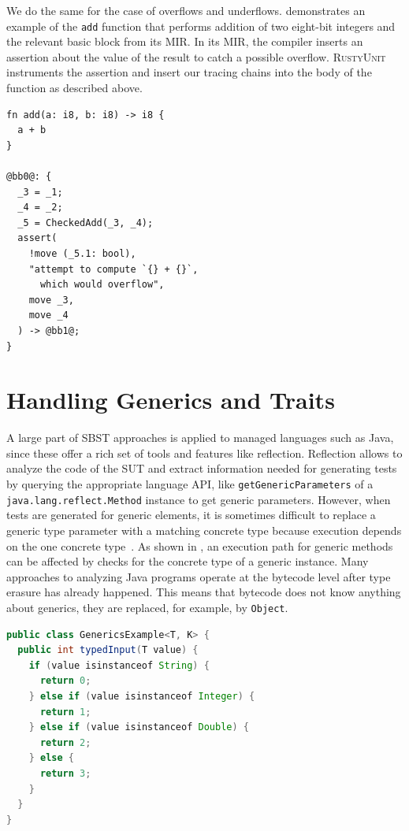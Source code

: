 \documentclass[paper=a4,%
  twoside,%
  BCOR4mm,%
  abstract=true,%
  toc=bibliography,%
  chapterprefix=true,%
  toc=bibliographynumbered,%
  open=right,%
  english,%
  pagesize=pdftex]{scrreprt}
\newcommand{\tech}{\textsc{RustyUnit}\xspace}
\newcommand{\mir}{\ac{MIR}\xspace}
\newcommand{\sut}{\ac{SUT}\xspace}
\begin{document}
We do the same for the case of overflows and underflows.  demonstrates an example of the \texttt{add} function that performs addition of two eight-bit integers and the relevant basic block from its \mir. In its \mir, the compiler inserts an assertion about the value of the result to catch a possible overflow. \tech instruments the assertion and insert our tracing chains into the body of the function as described above.
\begin{lstlisting}[language={MIR}, style=boxed, caption={\mir overflow check created by the compiler}, label=lst:mir-overflow-check]
fn add(a: i8, b: i8) -> i8 {
  a + b
}

@bb0@: {
  _3 = _1;
  _4 = _2;
  _5 = CheckedAdd(_3, _4);
  assert(
    !move (_5.1: bool),
    "attempt to compute `{} + {}`,
      which would overflow",
    move _3,
    move _4
  ) -> @bb1@;
}
\end{lstlisting}

\section{Handling Generics and Traits}
A large part of \ac{SBST} approaches is applied to managed languages such as Java, since these offer a rich set of tools and features like reflection. Reflection allows to analyze the code of the \sut and extract information needed for generating tests by querying the appropriate language \ac{API}, like \texttt{getGenericParameters} of a \texttt{java.lang.reflect.Method} instance to get generic parameters. However, when tests are generated for generic elements, it is sometimes difficult to replace a generic type parameter with a matching concrete type because execution depends on the one concrete type~\cite{Fraser2014b}. As shown in , an execution path for generic methods can be affected by checks for the concrete type of a generic instance. Many approaches to analyzing Java programs operate at the bytecode level after type erasure has already happened. This means that bytecode does not know anything about generics, they are replaced, for example, by \texttt{Object}.

\begin{lstlisting}[language=Java, style=boxed, caption={The execution path of the generic Java method depends on the concrete type of the argument}, label=lst:java-isinstanceof]
public class GenericsExample<T, K> {
  public int typedInput(T value) {
    if (value isinstanceof String) {
      return 0;
    } else if (value isinstanceof Integer) {
      return 1;
    } else if (value isinstanceof Double) {
      return 2;
    } else {
      return 3;
    }
  }
}
\end{lstlisting}
\end{document}
